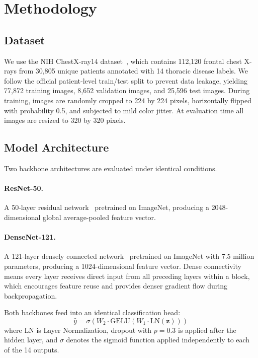 \documentclass[runningheads]{llncs}
\begin{document}
\section{Methodology}
\label{sec:method}

\subsection{Dataset}
We use the NIH ChestX-ray14 dataset~\cite{wang2017chestxray14},
which contains 112,120 frontal chest X-rays from 30,805 unique
patients annotated with 14 thoracic disease labels. We follow the
official patient-level train/test split to prevent data leakage,
yielding 77,872 training images, 8,652 validation images, and
25,596 test images. During training, images are randomly cropped
to 224 by 224 pixels, horizontally flipped with probability 0.5,
and subjected to mild color jitter. At evaluation time all images
are resized to 320 by 320 pixels.

\subsection{Model Architecture}
Two backbone architectures are evaluated under identical conditions.

\paragraph{ResNet-50.}
A 50-layer residual network~\cite{he2016resnet} pretrained on
ImageNet, producing a 2048-dimensional global average-pooled
feature vector.

\paragraph{DenseNet-121.}
A 121-layer densely connected network~\cite{huang2017densenet}
pretrained on ImageNet with 7.5 million parameters, producing a
1024-dimensional feature vector. Dense connectivity means every
layer receives direct input from all preceding layers within a
block, which encourages feature reuse and provides denser gradient
flow during backpropagation.

Both backbones feed into an identical classification head:
\begin{equation}
  \hat{y} = \sigma\!\left( W_2 \cdot \text{GELU}(W_1 \cdot
  \text{LN}(\mathbf{z})) \right)
  \label{eq:head}
\end{equation}
where $\text{LN}$ is Layer Normalization, dropout with $p = 0.3$
is applied after the hidden layer, and $\sigma$ denotes the
sigmoid function applied independently to each of the 14 outputs.
\end{document}
